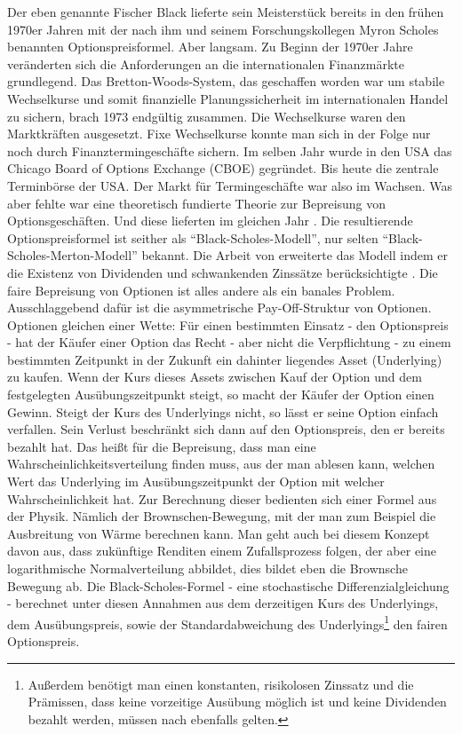 Der eben genannte Fischer Black lieferte sein Meisterstück bereits in den frühen 1970er Jahren mit der nach ihm und seinem Forschungskollegen Myron Scholes benannten Optionspreisformel. Aber langsam. Zu Beginn der 1970er Jahre veränderten sich die Anforderungen an die internationalen Finanzmärkte grundlegend. Das Bretton-Woods-System, das geschaffen worden war um stabile Wechselkurse und somit finanzielle Planungssicherheit im internationalen Handel zu sichern, brach 1973 endgültig zusammen. Die Wechselkurse waren den Marktkräften ausgesetzt. Fixe Wechselkurse konnte man sich in der Folge nur noch durch Finanztermingeschäfte sichern. Im selben Jahr wurde in den USA das Chicago Board of Options Exchange (CBOE) gegründet. Bis heute die zentrale Terminbörse der USA. Der Markt für Termingeschäfte war also im Wachsen. Was aber fehlte war eine theoretisch fundierte Theorie zur Bepreisung von Optionsgeschäften. Und diese lieferten im gleichen Jahr \textcite{Black1973}. Die resultierende Optionspreisformel ist seither als "`Black-Scholes-Modell"', nur selten "`Black-Scholes-Merton-Modell"' bekannt. Die Arbeit von \textcite{Merton1973} erweiterte das Modell indem er die Existenz von Dividenden und schwankenden Zinssätze berücksichtigte \parencite{Scholes1997}.  Die faire Bepreisung von Optionen ist alles andere als ein banales Problem. Ausschlaggebend dafür ist die asymmetrische Pay-Off-Struktur von Optionen. Optionen gleichen einer Wette: Für einen bestimmten Einsatz - den Optionspreis - hat der Käufer einer Option das Recht - aber nicht die Verpflichtung - zu einem bestimmten Zeitpunkt in der Zukunft ein dahinter liegendes Asset (Underlying) zu kaufen. Wenn der Kurs dieses Assets zwischen Kauf der Option und dem festgelegten Ausübungszeitpunkt steigt, so macht der Käufer der Option einen Gewinn. Steigt der Kurs des Underlyings nicht, so lässt er seine Option einfach verfallen. Sein Verlust beschränkt sich dann auf den Optionspreis, den er bereits bezahlt hat.
Das heißt für die Bepreisung, dass man eine Wahrscheinlichkeitsverteilung finden muss, aus der man ablesen kann, welchen Wert das Underlying im Ausübungszeitpunkt der Option mit welcher Wahrscheinlichkeit hat. Zur Berechnung dieser bedienten sich \textcite{Black1973} einer Formel aus der Physik. Nämlich der Brownschen-Bewegung, mit der man zum Beispiel die Ausbreitung von Wärme berechnen kann. Man geht auch bei diesem Konzept davon aus, dass zukünftige Renditen einem Zufallsprozess folgen, der aber eine logarithmische Normalverteilung abbildet, dies bildet eben die Brownsche Bewegung ab. Die Black-Scholes-Formel - eine stochastische Differenzialgleichung - berechnet unter diesen Annahmen aus dem derzeitigen Kurs des Underlyings, dem Ausübungspreis, sowie der Standardabweichung des Underlyings\footnote{Außerdem benötigt man einen konstanten, risikolosen Zinssatz und die Prämissen, dass keine vorzeitige Ausübung möglich ist und keine Dividenden bezahlt werden, müssen nach \textcite{Black1973} ebenfalls gelten.} den fairen Optionspreis.
